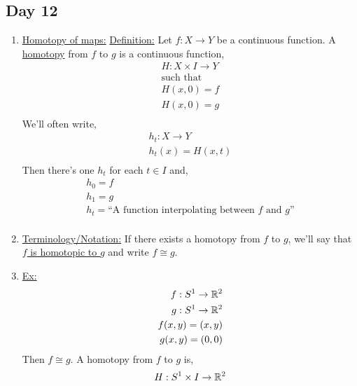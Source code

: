 \subsection{Day 12}
    \begin{enumerate}
        \item \underline{Homotopy of maps:}
            \underline{Definition:} Let $f: X\rightarrow Y$ be a continuous function.
            A \underline{homotopy} from $f$ to $g$ is a continuous function,
            \begin{align*}
                H:X\times I \rightarrow Y\\
                \text{such that}\\
                H(x,0)=f\\
                H(x,0)=g\\
            \end{align*}
            We'll often write,
            \begin{align*}
                h_t:X \rightarrow Y\\
                h_t(x)=H(x,t)\\
            \end{align*}
            Then there's one $h_t$ for each $t\in I$ and,
            \begin{align*}
                h_0=f\\
                h_1=g\\
                h_t=\text{``A function interpolating between $f$ and $g$''}\\
            \end{align*}
        \item \underline{Terminology/Notation:} If there exists a homotopy from
            $f$ to $g$, we'll say that \underline{$f$ is homotopic to $g$} and write
            $f\cong g$.\\
        \item \underline{Ex:}
            \begin{align*}
                f: S^{1}\rightarrow \mathbb{R}^2\\
                g: S^{1}\rightarrow \mathbb{R}^2\\
                f(x,y)=(x,y)\\
                g(x,y)=(0,0)\\
            \end{align*}
            Then $f\cong g$. A homotopy from $f$ to $g$ is,
            \begin{align*}
                H: S^{1}\times I \rightarrow \R^2\\

\end{align*}
\end{enumerate}
